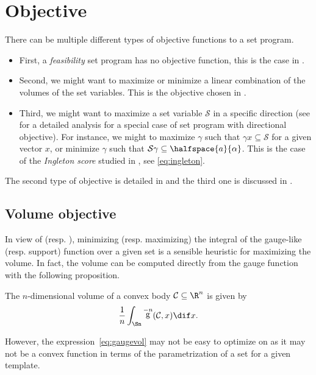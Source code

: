 \documentclass[11pt,twoside,a4paper,openright]{uclouvain-thesis}
\newcommand{\Cset}{\mathcal{C}}
\DeclareMathOperator{\gauge}{g}
\begin{document}
\section{Objective}
\label{sec:objective}
There can be multiple different types of objective functions to a set program.
\begin{itemize}
  \item
    First, a \emph{feasibility} set program has no objective function, this is the case in .
  \item
    Second, we might want to maximize or minimize a linear combination of the volumes of the set variables.
    This is the objective chosen in .
  \item
    Third, we might want to maximize a set variable $\mathcal{S}$ in a specific direction (see \cite{ahmadi2018robust} for a detailed analysis for a special case of set program with directional objective).
    For instance, we might to maximize $\gamma$ such that $\gamma x \subseteq \mathcal{S}$ for a given vector $x$, or minimize $\gamma$ such that $\mathcal{S} \gamma \subseteq \halfspace{a}{\alpha}$.
    This is the case of the \emph{Ingleton score} studied in , see \eqref{eq:ingleton}.
\end{itemize}

The second type of objective is detailed in  and the third one is discussed in .

\subsection{Volume objective}
\label{sec:volobj}

In view of  (resp. ), minimizing (resp. maximizing) the integral of the gauge-like (resp. support) function
over a given set is a sensible heuristic for maximizing the volume.
In fact, the volume can be computed directly from the gauge function
with the following proposition.
\begin{myprop}
  The $n$-dimensional volume of a convex body $\Cset \subseteq \R^n$ is given by
  \begin{equation}
    \label{eq:gaugevol}
    \frac{1}{n} \int_{\Sn} \gauge^{-n}(\Cset, x) \dif x.
  \end{equation}
\end{myprop}
However, the expression~\eqref{eq:gaugevol} may not be easy to optimize on as
it may not be a convex function in terms of the parametrization of a set for a given template.
\end{document}
